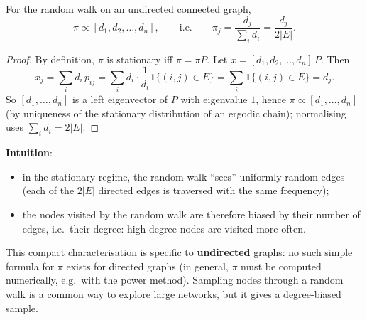 \begin{theorem}[Lemma]
For the random walk on an undirected connected graph,
\[
\pi \propto [d_1, d_2, \dots, d_n], \qquad \text{i.e.} \qquad \pi_j = \frac{d_j}{\sum_i d_i} = \frac{d_j}{2|E|}.
\]
\end{theorem}

\begin{proof}
By definition, $\pi$ is stationary iff $\pi = \pi P$. Let $x = [d_1, d_2, \dots, d_n]\,P$. Then
\[
x_j = \sum_i d_i\, p_{ij} = \sum_i d_i \cdot \frac{1}{d_i}\mathbf{1}\{(i,j) \in E\} = \sum_i \mathbf{1}\{(i, j) \in E\} = d_j.
\]
So $[d_1, \dots, d_n]$ is a left eigenvector of $P$ with eigenvalue $1$, hence $\pi \propto [d_1, \dots, d_n]$ (by uniqueness of the stationary distribution of an ergodic chain); normalising uses $\sum_i d_i = 2|E|$.
\end{proof}

\textbf{Intuition}:
\begin{itemize}
    \item in the stationary regime, the random walk ``sees'' uniformly random edges (each of the $2|E|$ directed edges is traversed with the same frequency);
    \item the nodes visited by the random walk are therefore biased by their number of edges, i.e.\ their degree: high-degree nodes are visited more often.
\end{itemize}

\begin{remark}
This compact characterisation is specific to \textbf{undirected} graphs: no such simple formula for $\pi$ exists for directed graphs (in general, $\pi$ must be computed numerically, e.g.\ with the power method). Sampling nodes through a random walk is a common way to explore large networks, but it gives a degree-biased sample.
\end{remark}

